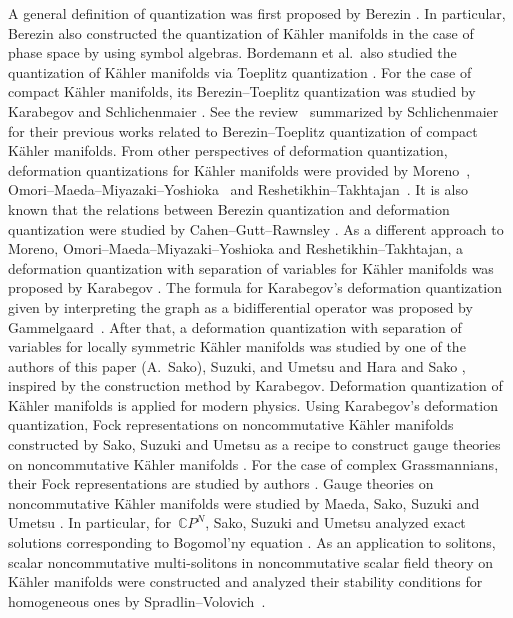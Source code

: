 \documentclass[pdftex]{sigma}
\numberwithin{equation}{section}
\begin{document}
A general definition of quantization was first proposed by Berezin \cite{Bere1,Bere2}. In particular, Berezin also constructed the quantization of K\"ahler manifolds in the case of phase space by using symbol algebras. Bordemann et al.\ also studied the quantization of K\"ahler manifolds via Toeplitz quantization \cite{BMS}. For the case of compact K\"ahler manifolds, its Berezin--Toeplitz quantization was studied by Karabegov and Schlichenmaier \cite{KS1,Schli1,Schli3,Schli2,Schli4,Schli5}. See the review~\cite{Schli6,Schli7} summarized by Schlichenmaier for their previous works related to Berezin--Toeplitz quantization of compact K\"ahler manifolds. From other perspectives of deformation quantization, deformation quantizations for K\"ahler manifolds were provided by Moreno~\cite{Mor1,Mor2}, Omori--Maeda--Miyazaki--Yoshioka~\cite{OMMY} and Reshetikhin--Takhtajan~\cite{RT}. It is also known that the relations between Berezin quantization and deformation quantization were studied by Cahen--Gutt--Rawnsley \cite{CGR1,CGR2,CGR3,CGR4}. As a different approach to Moreno, Omori--Maeda--Miyazaki--Yoshioka and Reshetikhin--Takhtajan, a deformation quantization with separation of variables for K\"ahler manifolds was proposed by Karabegov \cite{Kara2,Kara1}. The formula for Karabegov's deformation quantization given by interpreting the graph as a bidifferential operator was proposed by Gammelgaard~\cite{Gam}. After that, a deformation quantization with separation of variables for locally symmetric K\"ahler manifolds was studied by one of the authors of this paper (A.~Sako), Suzuki, and Umetsu \cite{SSU1,SSU2} and Hara and Sako \cite{HS1,HS2}, inspired by the construction method by Karabegov. Deformation quantization of K\"ahler manifolds is applied for modern physics. Using Karabegov's deformation quantization, Fock representations on noncommutative K\"ahler manifolds constructed by Sako, Suzuki and Umetsu as a recipe to construct gauge theories on noncommutative K\"ahler manifolds \cite{SSU1,SSU2,SU1,SU2,SU3}. For the case of complex Grassmannians, their Fock representations are studied by authors \cite{OS_Gpq_F}. Gauge theories on noncommutative K\"ahler manifolds were studied by Maeda, Sako, Suzuki and Umetsu \cite{MSSU,Sako}. In particular, for~$\mathbb{C}P^{N}$, Sako, Suzuki and Umetsu analyzed exact solutions corresponding to Bogomol'ny equation \cite{SSU3}. As an application to solitons, scalar noncommutative multi-solitons in noncommutative scalar field theory on K\"ahler manifolds were constructed and analyzed their stability conditions for homogeneous ones by Spradlin--Volovich~\cite{SV}.
\end{document}
